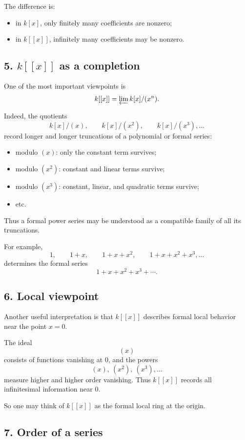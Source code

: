 \documentclass[12pt,a4paper]{article}
\theoremstyle{plain}
\theoremstyle{definition}      %
\begin{document}
	The difference is:
	\begin{itemize}
		\item in \(k[x]\), only finitely many coefficients are nonzero;
		\item in \(k[[x]]\), infinitely many coefficients may be nonzero.
	\end{itemize}
	
	\subsection*{5. \(k[[x]]\) as a completion}
	
	One of the most important viewpoints is
	\[
	k[[x]]=\varprojlim k[x]/(x^n).
	\]
	
	Indeed, the quotients
	\[
	k[x]/(x),\qquad k[x]/(x^2),\qquad k[x]/(x^3),\dots
	\]
	record longer and longer truncations of a polynomial or formal series:
	\begin{itemize}
		\item modulo \((x)\): only the constant term survives;
		\item modulo \((x^2)\): constant and linear terms survive;
		\item modulo \((x^3)\): constant, linear, and quadratic terms survive;
		\item etc.
	\end{itemize}
	
	Thus a formal power series may be understood as a compatible family of all its truncations.
	
	For example,
	\[
	1,\qquad
	1+x,\qquad
	1+x+x^2,\qquad
	1+x+x^2+x^3,\dots
	\]
	determines the formal series
	\[
	1+x+x^2+x^3+\cdots.
	\]
	
	\subsection*{6. Local viewpoint}
	
	Another useful interpretation is that \(k[[x]]\) describes formal local behavior near the point \(x=0\).
	
	The ideal
	\[
	(x)
	\]
	consists of functions vanishing at \(0\), and the powers
	\[
	(x),\ (x^2),\ (x^3),\dots
	\]
	measure higher and higher order vanishing. Thus \(k[[x]]\) records all infinitesimal information near \(0\).
	
	So one may think of \(k[[x]]\) as the formal local ring at the origin.
	
	\subsection*{7. Order of a series}
	
\end{document}
